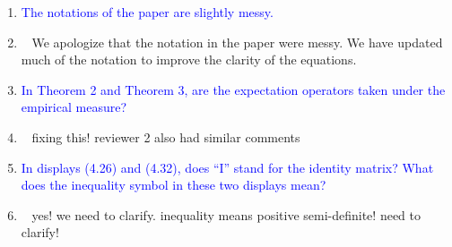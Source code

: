 \documentclass[]{article}
\newcommand{\point}[1]{\item \textcolor{blue}{#1}}
\newcommand{\reply}{\item[]\ }
\begin{document}
\begin{enumerate}
{			also get specific rates for these penalties.
		}
		
		\point{
		The notations of the paper are slightly messy.
		}
	
		\reply{
			We apologize that the notation in the paper were messy. We have updated much of the notation to improve the clarity of the equations.
		}
	
		\point{
			In Theorem 2 and Theorem 3, are the expectation operators taken under the empirical measure?
		}
		\reply{
			fixing this! reviewer 2 also had similar comments
		}
		\point{
			In displays (4.26) and (4.32), does “I” stand for the identity matrix? What does the inequality symbol in these two displays mean?
		}
	
		\reply{
			yes! we need to clarify.
			inequality means positive semi-definite! need to clarify!
		}
	\end{enumerate} 
	
\end{document}
